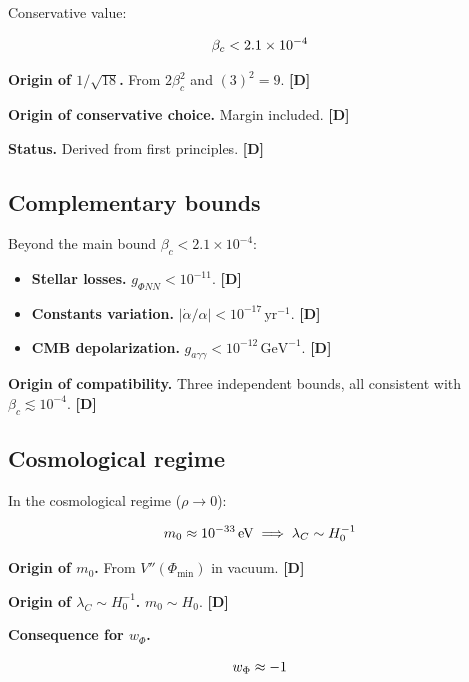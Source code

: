 ﻿\documentclass[11pt,letterpaper]{article}
\begin{document}
Conservative value:

\begin{equation*}
  \resizebox{\ifdim\width>\linewidth \linewidth\else\width\fi}{!}{$\displaystyle \beta_c < 2{.}1 \times 10^{-4}$}
\end{equation*}

\textbf{Origin of $1/\sqrt{18}$.} From $2\beta_c^2$ and $(3)^2 = 9$. \textbf{[D]}

\textbf{Origin of conservative choice.} Margin included. \textbf{[D]}

\textbf{Status.} Derived from first principles. \textbf{[D]}
\subsection{Complementary bounds}
Beyond the main bound $\beta_c < 2{.}1 \times 10^{-4}$:

\begin{itemize}[leftmargin=*]
\item \textbf{Stellar losses.} $g_{\Phi NN} < 10^{-11}$. \textbf{[D]}
\item \textbf{Constants variation.} $|\dot\alpha/\alpha| < 10^{-17}\,\text{yr}^{-1}$. \textbf{[D]}
\item \textbf{CMB depolarization.} $g_{a\gamma\gamma} < 10^{-12}\,\text{GeV}^{-1}$. \textbf{[D]}
\end{itemize}

\textbf{Origin of compatibility.} Three independent bounds, all consistent with $\beta_c \lesssim 10^{-4}$. \textbf{[D]}
\subsection{Cosmological regime}
In the cosmological regime ($\rho \to 0$):

\begin{equation*}
  \resizebox{\ifdim\width>\linewidth \linewidth\else\width\fi}{!}{$\displaystyle m_0 \approx 10^{-33}\,\text{eV} \implies \lambda_C \sim H_0^{-1}$}
\end{equation*}

\textbf{Origin of $m_0$.} From $V''(\Phi_{\text{min}})$ in vacuum. \textbf{[D]}

\textbf{Origin of $\lambda_C \sim H_0^{-1}$.} $m_0 \sim H_0$. \textbf{[D]}

\textbf{Consequence for $w_\Phi$.}

\begin{equation*}
  \resizebox{\ifdim\width>\linewidth \linewidth\else\width\fi}{!}{$\displaystyle w_\Phi \approx -1$}
\end{equation*}
\end{document}
